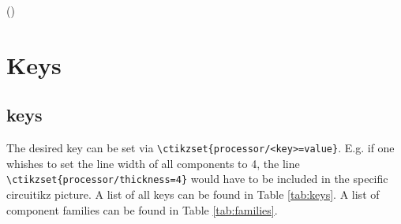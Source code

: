 \documentclass[10pt,a4paper]{scrartcl}
\begin{document}
()


\section{Keys}
\subsection{\Circuitikz{} keys}
The desired \Circuitikz{} key can be set via \verb|\ctikzset{processor/<key>=value}|. E.g. if one whishes to set the line width of all components to 4, the line  \verb|\ctikzset{processor/thickness=4}| would have to be included in the specific circuitikz picture. A list of all \Circuitikz{} keys can be found in Table \ref{tab:keys}. A list of component families can be found in Table \ref{tab:families}.
\end{document}
